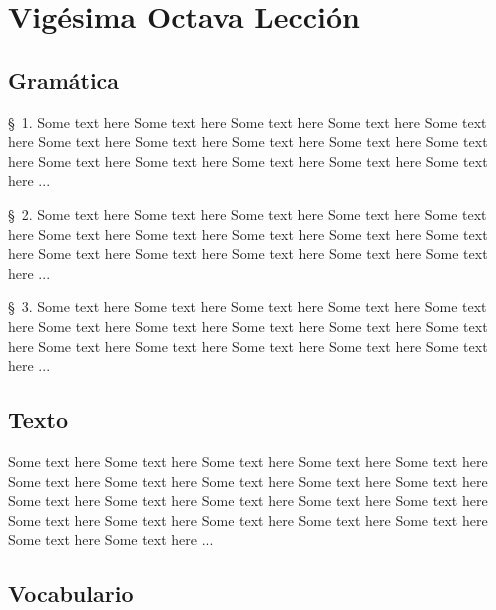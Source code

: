 
\chapter{Vigésima Octava Lección} %

\label{ch:lesson28} %



\Large{\section*{Gramática}}

\S\ 1. Some text here Some text here Some text here Some text here Some text here Some text here Some text here Some text here Some text here Some text here Some text here Some text here Some text here Some text here Some text here ...

\S\ 2. Some text here Some text here Some text here Some text here Some text here Some text here Some text here Some text here Some text here Some text here Some text here Some text here Some text here Some text here Some text here ...

\S\ 3. Some text here Some text here Some text here Some text here Some text here Some text here Some text here Some text here Some text here Some text here Some text here Some text here Some text here Some text here Some text here ...

\Large{\section*{Texto}}

Some text here Some text here Some text here Some text here Some text here Some text here Some text here Some text here Some text here Some text here Some text here Some text here Some text here Some text here Some text here Some text here Some text here Some text here Some text here Some text here Some text here Some text here ...

\Large{\section*{Vocabulario}}

